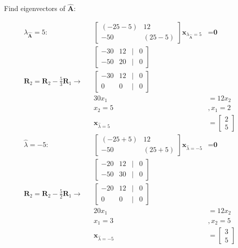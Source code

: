 \documentclass{article}
\begin{document}
Find eigenvectors of $\hat{\textbf{A}}$:

\begin{align}
    \label{eq:28}
    \lambda_{\hat{\textbf{A}}} = 5: && \begin{bmatrix}
    (-25-5) & 12\\
    -50 & (25-5)
    \end{bmatrix} \textbf{x}_{\lambda_{\hat{\textbf{A}}} = 5} &= \textbf{0}
    \\
    \label{eq:29}
    && \begin{bmatrix}
    -30 & 12 &|& 0\\
    -50 & 20 &|& 0
    \end{bmatrix}
    \\ 
    \label{eq:30}
    \textbf{R}_2 = \textbf{R}_2 -\frac{5}{3}\textbf{R}_1 \rightarrow && \begin{bmatrix}
    -30 & 12 &|& 0\\
    0 & 0 &|& 0
    \end{bmatrix}
    \\
    \label{eq:31}
    && 30x_1 &= 12x_2
    \\
    \label{eq:32}
    && x_2 = 5 &, x_1 = 2
    \\
    \label{eq:33}
    && \textbf{x}_{\hat{\lambda} = 5} &= \begin{bmatrix}
    2\\5
    \end{bmatrix}
    \\
    \label{eq:34}
    \hat{\lambda}=-5: && \begin{bmatrix}
    (-25+5) & 12\\
    -50 & (25+5)
    \end{bmatrix} \textbf{x}_{\hat{\lambda}=-5} &= \textbf{0}
    \\
    \label{eq:35}
    &&\begin{bmatrix}
    -20 & 12 &|& 0\\
    -50 & 30 &|& 0
    \end{bmatrix}
    \\
    \label{eq:36}
    \textbf{R}_2 = \textbf{R}_2 - \frac{5}{2}\textbf{R}_1 \rightarrow && \begin{bmatrix}
    -20 & 12 &|& 0\\
    0 & 0 &|& 0
    \end{bmatrix}
    \\
    \label{eq:37}
    && 20x_1 &= 12x_2
    \\
    \label{eq:38}
    && x_1 = 3 &, x_2 = 5
    \\
    \label{eq:39}
    && \textbf{x}_{\hat{\lambda}=-5} &= \begin{bmatrix}
    3 \\ 5
    \end{bmatrix}
\end{align}
\end{document}
